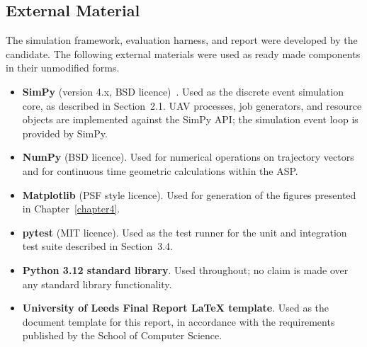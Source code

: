 \begin{appendices}
\vspace{1em}

%
%
\chapter{External Material}

The simulation framework, evaluation harness, and report were developed by the candidate. The following external materials were used as ready made components in their unmodified forms.\par

\vspace{1em}

\begin{itemize}
\item \textbf{SimPy} (version 4.x, BSD licence)~\citep{simpy2024}. Used as the discrete event simulation core, as described in Section~2.1. UAV processes, job generators, and resource objects are implemented against the SimPy API; the simulation event loop is provided by SimPy.
\item \textbf{NumPy} (BSD licence). Used for numerical operations on trajectory vectors and for continuous time geometric calculations within the ASP.
\item \textbf{Matplotlib} (PSF style licence). Used for generation of the figures presented in Chapter~\ref{chapter4}.
\item \textbf{pytest} (MIT licence). Used as the test runner for the unit and integration test suite described in Section~3.4.
\item \textbf{Python 3.12 standard library}. Used throughout; no claim is made over any standard library functionality.
\item \textbf{University of Leeds Final Report \LaTeX{} template}. Used as the document template for this report, in accordance with the requirements published by the School of Computer Science.
\end{itemize}


\end{appendices}